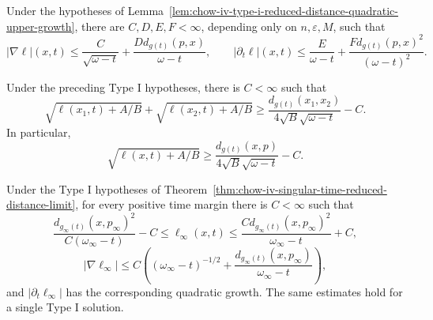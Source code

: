 \begin{corollary}
\label{cor:chow-iv-type-i-reduced-distance-derivative-bounds}
Under the hypotheses of
Lemma~\ref{lem:chow-iv-type-i-reduced-distance-quadratic-upper-growth}, there
are \(C,D,E,F<\infty\), depending only on \(n,\varepsilon,M\), such that
\[
 |\nabla\ell|(x,t)\leq \frac C{\sqrt{\omega-t}}
 +\frac{D d_{g(t)}(p,x)}{\omega-t},
\qquad
 |\partial_t\ell|(x,t)\leq\frac E{\omega-t}
 +\frac{F d_{g(t)}(p,x)^2}{(\omega-t)^2}.
\]
\end{corollary}

\begin{lemma}
\label{lem:chow-iv-type-i-reduced-distance-lower-bound}
Under the preceding Type I hypotheses, there is \(C<\infty\) such that
\[
 \sqrt{\ell(x_1,t)+A/B}+\sqrt{\ell(x_2,t)+A/B}
 \geq \frac{d_{g(t)}(x_1,x_2)}{4\sqrt B\sqrt{\omega-t}}-C.
\]
In particular,
\[
 \sqrt{\ell(x,t)+A/B}
 \geq\frac{d_{g(t)}(x,p)}{4\sqrt B\sqrt{\omega-t}}-C.
\]
\end{lemma}

\begin{proposition}
\label{prop:chow-iv-limit-reduced-distance-estimates}
Under the Type I hypotheses of
Theorem~\ref{thm:chow-iv-singular-time-reduced-distance-limit}, for every
positive time margin there is \(C<\infty\) such that
\[
 \frac{d_{g_\infty(t)}(x,p_\infty)^2}{C(\omega_\infty-t)}-C
 \leq\ell_\infty(x,t)\leq
 \frac{C d_{g_\infty(t)}(x,p_\infty)^2}{\omega_\infty-t}+C,
\]
\[
 |\nabla\ell_\infty|\leq C\left((\omega_\infty-t)^{-1/2}
 +\frac{d_{g_\infty(t)}(x,p_\infty)}{\omega_\infty-t}\right),
\]
and \(|\partial_t\ell_\infty|\) has the corresponding quadratic growth.
The same estimates hold for a single Type I solution.
\end{proposition}


